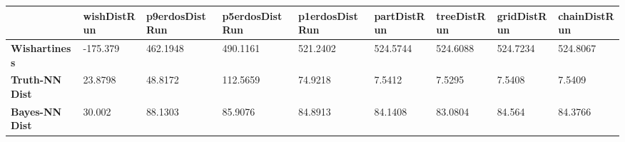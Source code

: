 \begin{tabular}{|l|l|l|l|l|l|l|l|l|}
\hline
&\textbf{wishDistRun}&\textbf{p9erdosDistRun}&\textbf{p5erdosDistRun}&\textbf{p1erdosDistRun}&\textbf{partDistRun}&\textbf{treeDistRun}&\textbf{gridDistRun}&\textbf{chainDistRun}\\\hline
\textbf{Wishartiness}&-175.379&462.1948&490.1161&521.2402&524.5744&524.6088&524.7234&524.8067\\\hline
\textbf{Truth-NN Dist}&23.8798&48.8172&112.5659&74.9218&7.5412&7.5295&7.5408&7.5409\\\hline
\textbf{Bayes-NN Dist}&30.002&88.1303&85.9076&84.8913&84.1408&83.0804&84.564&84.3766\\\hline
\end{tabular}
